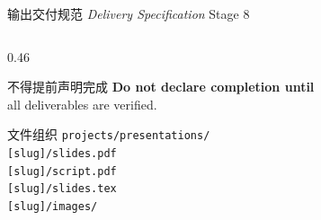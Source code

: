 \documentclass[aspectratio=169,10pt]{beamer}
\newcommand{\EN}[1]{\textit{#1}}
\newcommand{\sectag}[1]{\textmd{\small\normalfont\textcolor{deepblue!60}{#1}}}
\begin{document}
\begin{frame}{输出交付规范 \EN{Delivery Specification} \sectag{Stage 8}}
\begin{columns}[T]
\begin{column}{0.46\textwidth}
\begin{alertblock}{\small 不得提前声明完成}
        \textbf{Do not declare completion until}\\
        all deliverables are verified.
      \end{alertblock}
      \vspace{4pt}
      \begin{block}{\small 文件组织}
        \footnotesize
        \texttt{projects/presentations/}\\
        \quad\texttt{[slug]/slides.pdf}\\
        \quad\texttt{[slug]/script.pdf}\\
        \quad\texttt{[slug]/slides.tex}\\
        \quad\texttt{[slug]/images/}
      \end{block}
    \end{column}
  \end{columns}
\end{frame}
\end{document}
